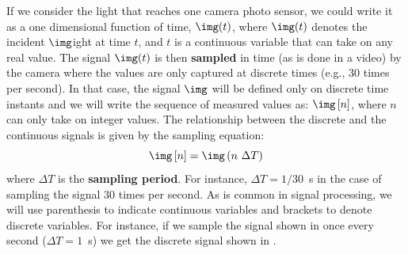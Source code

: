 
If we consider the light that reaches one camera photo sensor, we could write it as a one dimensional function of time, $\img (t)$, where $\img (t)$ denotes the incident $\img$ight at time $t$, and $t$ is a continuous variable that can take on any real value.
The signal $\img (t)$ is then {\bf sampled} in time (as is done in a video) by the camera where the values are only captured at discrete times (e.g., 30 times per second).
In that case, the signal $\img$ will be defined only on discrete time instants and we will write the sequence of measured values as: $\img \left[ n \right]$, where $n$ can only take on integer values. The relationship between the discrete and the continuous signals is given by the sampling equation:
\begin{equation}
	\img \left[n\right] = \img \left(n~\Delta T \right)
\end{equation}
where $\Delta T$ is the {\bf sampling period}. For instance, $\Delta T = 1/30$~s in the case of sampling the signal 30 times per second.
%
As is common in signal processing, we will use parenthesis to indicate continuous variables and brackets to denote discrete variables. For instance, if we sample the signal shown in  once every second ($\Delta T = 1$~s) we get the discrete signal shown in .



